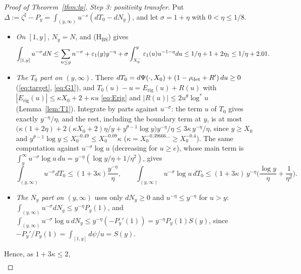 \begin{proof}[Proof of Theorem~\ref{thm:lp}]
\emph{Step 3: positivity transfer.} Put $\Delta:=\zeta^\sharp-P_y=\int_{(y,\infty)}u^{-s}(dT_0-dN_y)$, and let $\sigma=1+\eta$
with $0<\eta\le1/8$.
\begin{itemize}
\item \emph{On $[1,y]$}, $N_y=N$, and \textup{(H$_{\mathrm{BS}}$)} gives
  \[
    \int_{[1,y]}u^{-\sigma}dN\le\sum_{n\le y}n^{-\sigma}+\varepsilon_1(y)y^{-\eta}+\sigma\int_{X_0^{-}}^y\varepsilon_1(u)u^{-1-\eta}du
    \le1/\eta+1+2\eta_1\le1/\eta+2.01 .
  \]
\item \emph{The $T_0$ part on $(y,\infty)$.} There $dT_0=d\Psi(\cdot,X_0)+(1-\rho_{\mathrm{det}}+R')\,du\ge0$ (\eqref{eq:target},
  \eqref{eq:G1}), and $T_0(u)-u=E_{\mathrm{rig}}(u)+R(u)$ with $|E_{\mathrm{rig}}(u)|\le\kappa X_0+2+\kappa u$ \eqref{eq:Erig} and
  $|R(u)|\le2u^\theta\log^*u$ (Lemma~\ref{lem:T1}). Integrate by parts against $u^{-\sigma}$: the term $u$ of $T_0$ gives exactly
  $y^{-\eta}/\eta$, and the rest, including the boundary term at $y$, is at most
  $\big(\kappa(1+2\eta)+2(\kappa X_0+2)\eta/y+y^{\theta-1}\log y\big)y^{-\eta}/\eta\le3\kappa\,y^{-\eta}/\eta$, since $y\ge X_0$ and
  $y^{\theta-1}\log y\le X_0^{-0.49}\le X_0^{-0.09}\kappa$ ($\kappa=X_0^{-0.39666\ldots}\ge X_0^{-0.4}$).
The same computation against $u^{-\sigma}\log u$ (decreasing for $u\ge e$), whose main
  term is $\int_y^\infty u^{-\sigma}\log u\,du=y^{-\eta}(\log y/\eta+1/\eta^2)$, gives
  \[
    \int_{(y,\infty)}u^{-\sigma}dT_0\le(1+3\kappa)\frac{y^{-\eta}}\eta,\qquad
    \int_{(y,\infty)}u^{-\sigma}\log u\,dT_0\le(1+3\kappa)\,y^{-\eta}\Big(\frac{\log y}\eta+\frac1{\eta^2}\Big).
  \]
\item \emph{The $N_y$ part on $(y,\infty)$} uses only $dN_y\ge0$ and $u^{-\eta}\le y^{-\eta}$ for $u>y$:
  $\int_{(y,\infty)}u^{-\sigma}dN_y\le y^{-\eta}P_y(1)$, and $\int_{(y,\infty)}u^{-\sigma}\log u\,dN_y\le y^{-\eta}(-P_y'(1))=y^{-\eta}P_y(1)S(y)$,
  since $-P_y'/P_y(1)=\int_{[1,y]}d\psi/u=S(y)$.
\end{itemize}
Hence, as $1+3\kappa\le2$,
\begin{gather*}

\end{gather*}
\end{proof}
